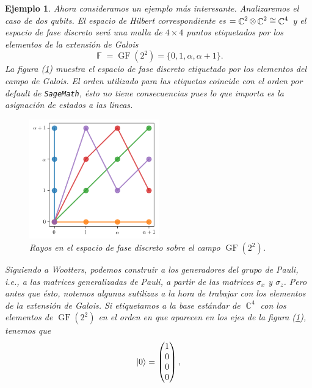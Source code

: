 \documentclass[a4paper,11pt]{report}
\DeclareMathOperator{\C}{\mathbb{C}}
\DeclareMathOperator{\F}{\mathbb{F}}
\let\H\relax
\DeclareMathOperator{\H}{\mathcal H}
\DeclareMathOperator{\GF}{GF}
\newtheorem{example}{Ejemplo}
\begin{document}
  \begin{example}
    Ahora consideramos un ejemplo más interesante.
    Analizaremos el caso de dos qubits. El espacio de
    Hilbert correspondiente es $\H = \C^2 \otimes \C^2 \cong
    \C^{4}$ y el espacio de fase discreto será una malla de
    $4 \times 4$ puntos etiquetados por los elementos de la
    extensión de Galois
    \[
      \F
      = \GF\left( 2^2 \right) 
      = \{0,1,\alpha,\alpha+1\}.
    \] 
    La figura (\ref{fig:wootters-affine-2-qubits}) muestra
    el espacio de fase discreto etiquetado por los elementos
    del campo de Galois. El orden utilizado para las
    etiquetas coincide con el orden por default de
    \texttt{SageMath}, ésto no tiene consecuencias pues lo
    que importa es la asignación de estados a las lineas.
    \begin{figure}[ht]
      \centering
      \includegraphics[width=0.5\textwidth]{imgs/affine-desargues-2-2.png}
      \caption{Rayos en el espacio de fase discreto sobre el
        campo $\GF\left( 2^2 \right)$.}
      \label{fig:wootters-affine-2-qubits}
    \end{figure}
    Siguiendo a Wootters, podemos construir a los
    generadores del grupo de Pauli, i.e., a las matrices
    generalizadas de Pauli, a partir de las matrices
    $\sigma_x$ y $\sigma_z$. Pero antes que ésto, notemos
    algunas sutilizas a la hora de trabajar con los
    elementos de la extensión de Galois. Si etiquetamos a la
    base estándar de $\C^{4}$ con los elementos de
    $\GF(2^2)$ en el orden en que aparecen en los ejes de la
    figura (\ref{fig:wootters-affine-2-qubits}), tenemos que
    \[
      \ket 0
      = \begin{pmatrix} 1\\0\\0\\0 \end{pmatrix},
\]
\end{example}
\end{document}
